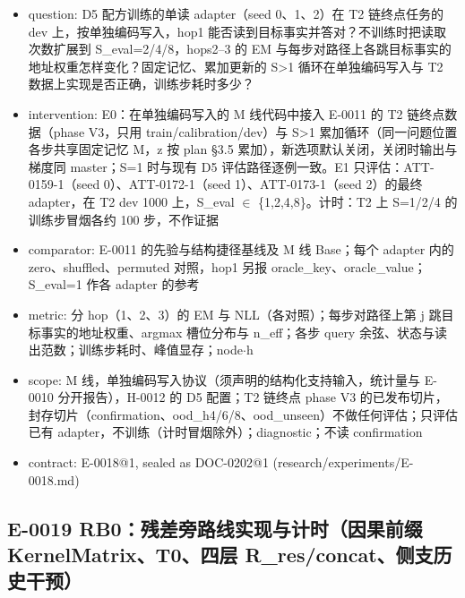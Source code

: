 \documentclass[11pt]{article}
\begin{document}
\begin{itemize}
\item question: D5 配方训练的单读 adapter（seed 0、1、2）在 T2 链终点任务的 dev 上，按单独编码写入，hop1 能否读到目标事实并答对？不训练时把读取次数扩展到 S\_eval=2/4/8，hops2--3 的 EM 与每步对路径上各跳目标事实的地址权重怎样变化？固定记忆、累加更新的 S\textgreater{}1 循环在单独编码写入与 T2 数据上实现是否正确，训练步耗时多少？
\item intervention: E0：在单独编码写入的 M 线代码中接入 E-0011 的 T2 链终点数据（phase V3，只用 train/calibration/dev）与 S\textgreater{}1 累加循环（同一问题位置各步共享固定记忆 M，z 按 plan §3.5 累加），新选项默认关闭，关闭时输出与梯度同 master；S=1 时与现有 D5 评估路径逐例一致。E1 只评估：ATT-0159-1（seed 0）、ATT-0172-1（seed 1）、ATT-0173-1（seed 2）的最终 adapter，在 T2 dev 1000 上，S\_eval \ensuremath{\in} \{1,2,4,8\}。计时：T2 上 S=1/2/4 的训练步冒烟各约 100 步，不作证据
\item comparator: E-0011 的先验与结构捷径基线及 M 线 Base；每个 adapter 内的 zero、shuffled、permuted 对照，hop1 另报 oracle\_key、oracle\_value；S\_eval=1 作各 adapter 的参考
\item metric: 分 hop（1、2、3）的 EM 与 NLL（各对照）；每步对路径上第 j 跳目标事实的地址权重、argmax 槽位分布与 n\_eff；各步 query 余弦、状态与读出范数；训练步耗时、峰值显存；node\ensuremath{\cdot}h
\item scope: M 线，单独编码写入协议（须声明的结构化支持输入，统计量与 E-0010 分开报告），H-0012 的 D5 配置；T2 链终点 phase V3 的已发布切片，封存切片（confirmation、ood\_h4/6/8、ood\_unseen）不做任何评估；只评估已有 adapter，不训练（计时冒烟除外）；diagnostic；不读 confirmation
\item contract: E-0018@1, sealed as DOC-0202@1 (research/experiments/E-0018.md)
\end{itemize}

\subsection*{E-0019 RB0：残差旁路线实现与计时（因果前缀 KernelMatrix、T0、四层 R\_res/concat、侧支历史干预）}
\end{document}

